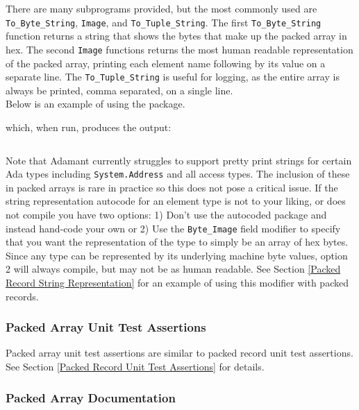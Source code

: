 There are many subprograms provided, but the most commonly used are \texttt{To\_Byte\_String}, \texttt{Image}, and \texttt{To\_Tuple\_String}. The first \texttt{To\_Byte\_String} function returns a string that shows the bytes that make up the packed array in hex. The second \texttt{Image} functions returns the most human readable representation of the packed array, printing each element name following by its value on a separate line. The \texttt{To\_Tuple\_String} is useful for logging, as the entire array is always be printed, comma separated, on a single line. \\

Below is an example of using the package.


which, when run, produces the output:

\vspace{5mm} %
\inputminted{text}{../example_architecture/array_representation/output.txt}
\vspace{5mm} %

Note that Adamant currently struggles to support pretty print strings for certain Ada types including \texttt{System.Address} and all access types. The inclusion of these in packed arrays is rare in practice so this does not pose a critical issue. If the string representation autocode for an element type is not to your liking, or does not compile you have two options: 1) Don't use the autocoded package and instead hand-code your own or 2) Use the \texttt{Byte\_Image} field modifier to specify that you want the representation of the type to simply be an array of hex bytes. Since any type can be represented by its underlying machine byte values, option 2 will always compile, but may not be as human readable. See Section \ref{Packed Record String Representation} for an example of using this modifier with packed records. 

\subsubsection{Packed Array Unit Test Assertions}

Packed array unit test assertions are similar to packed record unit test assertions. See Section \ref{Packed Record Unit Test Assertions} for details.

\subsubsection{Packed Array Documentation}

